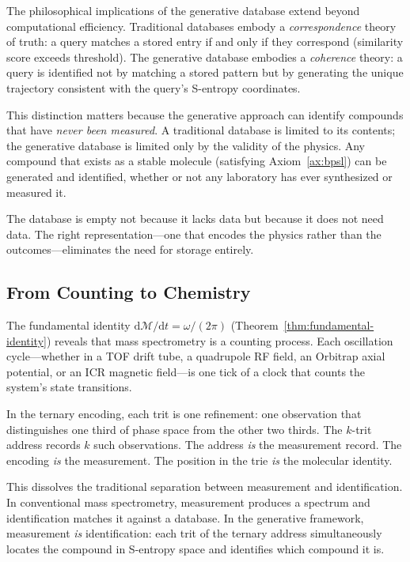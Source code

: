 \documentclass[11pt,twocolumn,a4paper]{article}
\theoremstyle{definition}
\theoremstyle{remark}
\newcommand{\Depth}{\mathcal{M}}
\begin{document}
The philosophical implications of the generative database extend beyond computational efficiency. Traditional databases embody a \emph{correspondence} theory of truth: a query matches a stored entry if and only if they correspond (similarity score exceeds threshold). The generative database embodies a \emph{coherence} theory: a query is identified not by matching a stored pattern but by generating the unique trajectory consistent with the query's S-entropy coordinates.

This distinction matters because the generative approach can identify compounds that have \emph{never been measured}. A traditional database is limited to its contents; the generative database is limited only by the validity of the physics. Any compound that exists as a stable molecule (satisfying Axiom~\ref{ax:bpsl}) can be generated and identified, whether or not any laboratory has ever synthesized or measured it.

The database is empty not because it lacks data but because it does not need data. The right representation---one that encodes the physics rather than the outcomes---eliminates the need for storage entirely.

\subsection{From Counting to Chemistry}
\label{sec:counting-to-chemistry}

The fundamental identity $\mathrm{d}\Depth/\mathrm{d}t = \omega/(2\pi)$ (Theorem~\ref{thm:fundamental-identity}) reveals that mass spectrometry is a counting process. Each oscillation cycle---whether in a TOF drift tube, a quadrupole RF field, an Orbitrap axial potential, or an ICR magnetic field---is one tick of a clock that counts the system's state transitions.

In the ternary encoding, each trit is one refinement: one observation that distinguishes one third of phase space from the other two thirds. The $k$-trit address records $k$ such observations. The address \emph{is} the measurement record. The encoding \emph{is} the measurement. The position in the trie \emph{is} the molecular identity.

This dissolves the traditional separation between measurement and identification. In conventional mass spectrometry, measurement produces a spectrum and identification matches it against a database. In the generative framework, measurement \emph{is} identification: each trit of the ternary address simultaneously locates the compound in S-entropy space and identifies which compound it is.
\end{document}
